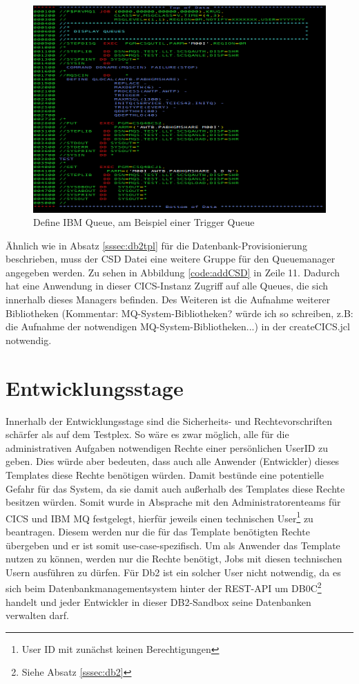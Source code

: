 \begin{figure}[h]
	\centering
	\includegraphics[width=\textwidth]{figures/defqjcl.PNG}
	\caption{Define IBM Queue, am Beispiel einer Trigger Queue}
	\label{code:defq}
\end{figure}

Ähnlich wie in Absatz \ref{sssec:db2tpl} für die Datenbank-Provisionierung beschrieben, muss der CSD Datei eine weitere Gruppe für den Queuemanager angegeben werden.
Zu sehen in Abbildung \ref{code:addCSD} in Zeile 11.
Dadurch hat eine Anwendung in dieser CICS-Instanz Zugriff auf alle Queues, die sich innerhalb dieses Managers befinden.
Des Weiteren ist die Aufnahme weiterer Bibliotheken (Kommentar: MQ-System-Bibliotheken? würde ich so schreiben, z.B: die Aufnahme der notwendigen MQ-System-Bibliotheken...) in der \glqq createCICS.jcl\grqq{} notwendig.

\section{Entwicklungsstage}
Innerhalb der Entwicklungsstage sind die Sicherheits- und Rechtevorschriften schärfer als auf dem Testplex.
So wäre es zwar möglich, alle für die administrativen Aufgaben notwendigen Rechte einer persönlichen UserID zu geben.
Dies würde aber bedeuten, dass auch alle Anwender (Entwickler) dieses Templates diese Rechte benötigen würden.
Damit bestünde eine potentielle Gefahr für das System, da sie damit auch außerhalb des Templates diese Rechte besitzen würden.
Somit wurde in Absprache mit den Administratorenteams für CICS und IBM MQ festgelegt, hierfür jeweils einen technischen User\footnote{User ID mit zunächst keinen Berechtigungen} zu beantragen.
Diesem werden nur die für das Template benötigten Rechte übergeben und er ist somit use-case-spezifisch.
Um als Anwender das Template nutzen zu können, werden nur die Rechte benötigt, Jobs mit diesen technischen Usern ausführen zu dürfen.
Für Db2 ist ein solcher User nicht notwendig, da es sich beim Datenbankmanagementsystem hinter der REST-API um DB0C\footnote{Siehe Absatz \ref{sssec:db2}} handelt und jeder Entwickler in dieser \glqq DB2-Sandbox\grqq{} seine Datenbanken verwalten darf. 

